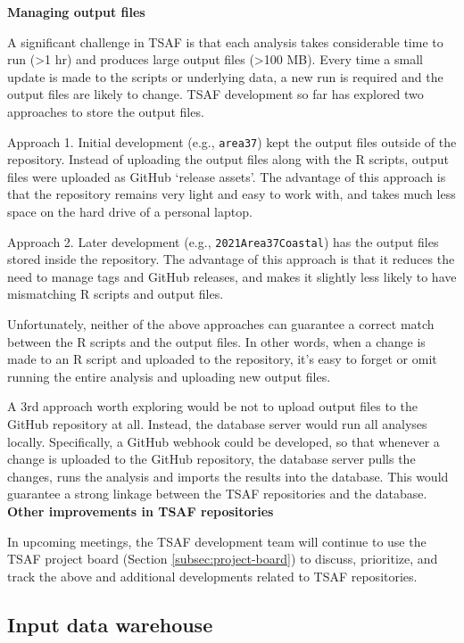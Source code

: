 \documentclass[12pt]{article}
\newcommand\gt{\raisebox{0.1ex}\textgreater}
\begin{document}
\textbf{Managing output files}

A significant challenge in TSAF is that each analysis takes considerable time to
run (\gt 1 hr) and produces large output files (\gt 100 MB). Every time a small
update is made to the scripts or underlying data, a new run is required and the
output files are likely to change. TSAF development so far has explored two
approaches to store the output files.

Approach 1. Initial development (e.g., \verb|area37|) kept the output files
outside of the repository. Instead of uploading the output files along with the
R scripts, output files were uploaded as GitHub `release assets'. The advantage
of this approach is that the repository remains very light and easy to work
with, and takes much less space on the hard drive of a personal laptop.

Approach 2. Later development (e.g., \verb|2021Area37Coastal|) has the output
files stored inside the repository. The advantage of this approach is that it
reduces the need to manage tags and GitHub releases, and makes it slightly less
likely to have mismatching R scripts and output files.

Unfortunately, neither of the above approaches can guarantee a correct match
between the R scripts and the output files. In other words, when a change is
made to an R script and uploaded to the repository, it's easy to forget or omit
running the entire analysis and uploading new output files.

A 3rd approach worth exploring would be not to upload output files to the GitHub
repository at all. Instead, the database server would run all analyses locally.
Specifically, a GitHub webhook could be developed, so that whenever a change is
uploaded to the GitHub repository, the database server pulls the changes, runs
the analysis and imports the results into the database. This would guarantee a
strong linkage between the TSAF repositories and the database.\\[-2ex]

\textbf{Other improvements in TSAF repositories}

In upcoming meetings, the TSAF development team will continue to use the TSAF
project board (Section \ref{subsec:project-board}) to discuss, prioritize, and
track the above and additional developments related to TSAF repositories.

\subsection{Input data warehouse}
\end{document}
